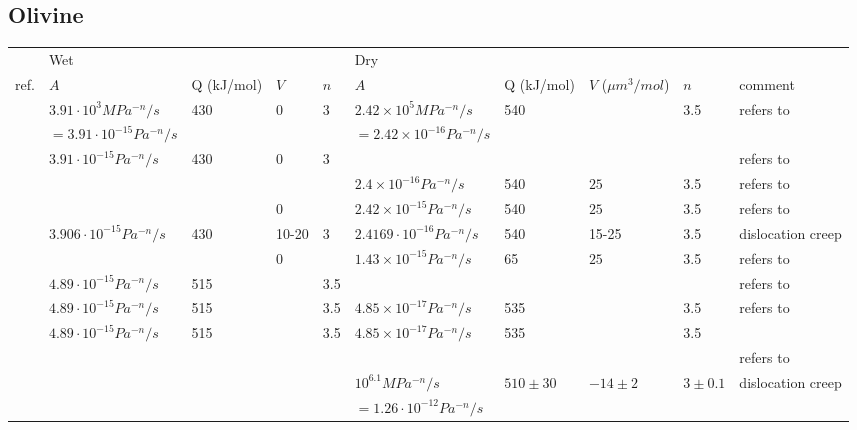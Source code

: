 
\subsection{Olivine}

\begin{tabular}{|l|llll|llll|p{4cm}|}
\hline
         & Wet                   &            &        &       & Dry           &           &        &     &\\
ref.     & $A$        & Q (kJ/mol) & $V$& $n$   & $A$ & Q (kJ/mol) & $V$ ($\mu m^3/mol$) & $n$ & comment\\
\hline\hline
\cite{gumb08} & $3.91\cdot 10^{3}MPa^{-n}/s$  & 430        &  0      & 3     & $2.42\times 10^5MPa^{-n}/s$  & 540    &        & 3.5    & refers to \cite{kawu93}\\
              & $=3.91\cdot 10^{-15}Pa^{-n}/s$ &&&&                            $=2.42\times 10^{-16}Pa^{-n}/s$  &&& \\ 
\cite{cube11} & $3.91\cdot 10^{-15}Pa^{-n}/s$ & 430        &  0      & 3     & &&&           & refers to \cite{kawu93}\\
\cite{hube03} &                   &            &      &        & $2.4\times10^{-16}Pa^{-n}/s$ & 540 & $25$& 3.5 & refers to \cite{kawu93} \\
\cite{hube07} &                       &            &     0   &       & $2.42\times10^{-15}Pa^{-n}/s$  & 540 & $25$& 3.5 & refers to \cite{kawu93} \\
\cite{kawu93} & $3.906\cdot10^{-15}Pa^{-n}/s$& 430 & 10-20 & 3 &$2.4169\cdot10^{-16}Pa^{-n}/s$ & 540 & 15-25 & 3.5 & dislocation creep\\
\hline
\cite{jahu12} &                       &            &     0   &       & $1.43\times10^{-15}Pa^{-n}/s$  & 65  & $25$& 3.5 & refers to \cite{kawu93} \\
\cite{grpy12} & $4.89\cdot10^{-15}Pa^{-n}/s$ & 515 & & 3.5 &&&&& refers to \cite{hiko96} \\
\cite{pybf02} & $4.89\cdot10^{-15}Pa^{-n}/s$ & 515 & & 3.5 & $4.85\times10^{-17}Pa^{-n}/s$ & 535 & & 3.5& refers to \cite{hiko96} \\
\cite{hiko96} & $4.89\cdot10^{-15}Pa^{-n}/s$ & 515 & & 3.5 &  $4.85\times10^{-17}Pa^{-n}/s$ & 535 & & 3.5& \\
\cite{qubt13} &    &&&&&&&& refers to \cite{hiko03} \\
\cite{kaju03} &    &&&& $10^{6.1}MPa^{-n}/s$  & $510\pm30$  & $-14\pm2$& $3\pm0.1$& dislocation creep \\
              &    &&&& $=1.26\cdot10^{-12}Pa^{-n}/s$ &&&&\\

\end{tabular}
